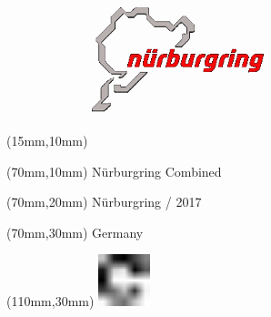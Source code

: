 \null\newpage
\begin{textblock*}{50mm}(15mm,10mm)%
\includegraphics[width=50mm]{LG/NUR.png}
\end{textblock*}
\begin{textblock*}{130mm}(70mm,10mm)%
{\fontsize{20}{20}\selectfont Nürburgring Combined}\\
\end{textblock*}
\begin{textblock*}{120mm}(70mm,20mm)%
{\fontsize{16}{16}\selectfont Nürburgring / 2017}\\
\end{textblock*}
\begin{textblock*}{120mm}(70mm,30mm)%
{\fontsize{12}{12}\selectfont Germany}
\end{textblock*}
\begin{textblock*}{30mm}(110mm,30mm)%
\centering
\includegraphics[height=15mm]{icons/fa-rotate-right.pdf}
\end{textblock*}
